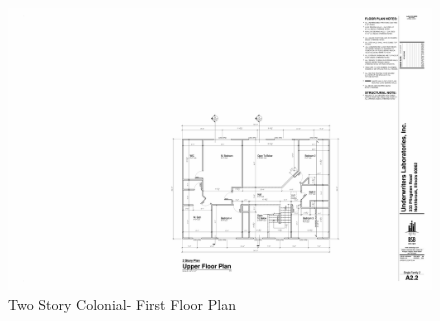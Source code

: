 \documentclass{article}
\begin{document}
\begin{appendices}
\clearpage

\begin{figure}
	\includegraphics[width = 6.25in]{0_Images/Construction_Drawings/2_Story_Floor_Plan_Upper.pdf}
	\caption{Two Story Colonial- First Floor Plan}
\end{figure}

\end{appendices}
\end{document}
